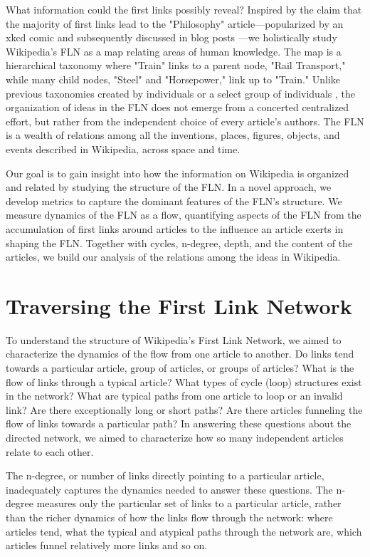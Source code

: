 \documentclass[pre,twocolumn,twoside,superscriptaddress,floatfix, aps, 10pt]{revtex4-1}
\begin{document}
What information could the first links possibly reveal?
Inspired by the claim that the majority of first links lead to the 
"Philosophy" article---popularized by an xkcd comic and subsequently
discussed in blog posts ---we holistically study 
Wikipedia's FLN as a map relating areas of human knowledge. 
The map is a hierarchical taxonomy where "Train" links to a parent node, 
"Rail Transport," while many child nodes, "Steel" and "Horsepower," link up to 
"Train." Unlike previous taxonomies
created by individuals
\cite{locke}
\cite{descartes}
\cite{aristotle} 
or a select group of individuals 
\cite{hist_thesaurus}, 
the organization of ideas in the FLN 
does not emerge from a concerted centralized effort, 
but rather from the independent choice of every article's authors.
The FLN is a wealth of relations among all the inventions, places,
figures, objects, and events described in Wikipedia, across space and time.


Our goal is to gain insight into how the information on Wikipedia is organized and related
by studying the structure of the FLN.
In a novel approach, we develop metrics to capture 
the dominant features of the FLN's structure.
We measure dynamics of the FLN as a flow, quantifying 
aspects of the FLN from the accumulation of first links around articles 
to the influence an article exerts in shaping the FLN.
Together with cycles, n-degree, depth, and the content of the articles, 
we build our analysis of the relations among the ideas in Wikipedia.


\section*{Traversing the First Link Network}

To understand the structure of Wikipedia's First Link Network, we
aimed to characterize the dynamics of the flow from one article to another. 
Do links tend towards a particular article, group of articles, or groups of articles? 
What is the flow of links through a typical article?
What types of cycle (loop) structures exist in the network?
What are typical paths from one article to loop or an invalid link? 
Are there exceptionally long or short paths? 
Are there articles funneling the flow of links towards a particular path?
In answering these questions about the directed network, we aimed to characterize 
how so many independent articles relate to each other.


The n-degree, or number of links directly pointing to a particular article,
inadequately captures the dynamics needed to answer these questions.
The n-degree measures only the particular set of links to a particular article, 
rather than the richer dynamics of how the links flow through the network: 
where articles tend, what the typical and atypical 
paths through the network are, which articles funnel relatively more links and so on. 
\end{document}
